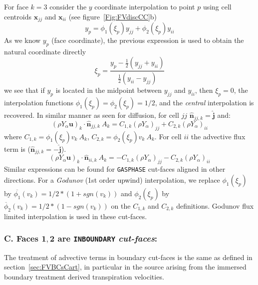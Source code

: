 \documentclass[12pt]{article}
\begin{document}
For face $k=3$ consider the $y$ coordinate interpolation to point $p$ using cell centroids $\mathbf{x}_{jj}$ and $\mathbf{x}_{ii}$ (see  figure~\ref{Fig:FVdiscCC}b)
%
\begin{equation}
  y_p =  \phi_1(\xi_p) y_{jj} + \phi_2(\xi_p) y_{ii}
\end{equation}
%
As we know $y_p$ (face coordinate), the previous expression is used to obtain the natural coordinate directly
%
\begin{equation}
  \xi_p = \frac{y_p - \frac{1}{2} \left( y_{jj} + y_{ii} \right)}{\frac{1}{2} \left( y_{ii} - y_{jj} \right)}
\end{equation}
%
we see that if $y_p$ is located in the midpoint between $y_{jj}$ and $y_{ii}$, then $\xi_p=0$, the interpolation functions $\phi_1(\xi_p)=\phi_2(\xi_p)=1/2$, and the \textit{central} interpolation is recovered. In similar manner as seen for diffusion, for cell $jj$
$\hat{\mathbf{n}}_{jj,k}=\hat{\mathbf{j}}$ and:
%
\begin{equation}
   \left( \rho Y_\alpha \mathbf{u} \right)_k \cdot \hat{\mathbf{n}}_{jj,k} \: A_k = C_{1,k} \left( \rho Y_\alpha \right)_{jj} + C_{2,k} \left( \rho Y_\alpha \right)_{ii}
\end{equation}
%
where $C_{1,k}=\phi_1(\xi_p) v_k \: A_k$, $C_{2,k}=\phi_2(\xi_p) v_k \: A_k$. For cell $ii$ the advective flux term is
($\hat{\mathbf{n}}_{jj,k}=-\hat{\mathbf{j}}$).
%
\begin{equation}
   \left( \rho Y_\alpha \mathbf{u} \right)_k \cdot \hat{\mathbf{n}}_{ii,k} \: A_k = - C_{1,k}  \left( \rho Y_\alpha \right)_{jj} - C_{2,k}  \left( \rho Y_\alpha \right)_{ii}
\end{equation}
%
Similar expressions can be found for \texttt{GASPHASE} cut-faces aligned in other directions. For a \textit{Godunov} (1st order upwind) interpolation,
we replace $\phi_1(\xi_p)$ by $\overline{\phi_1}(v_k)=1/2*(1+sgn(v_k))$ and $\phi_2(\xi_p)$ by $\overline{\phi}_2(v_k)=1/2*(1-sgn(v_k))$ on the $C_{1,k}$ and $C_{2,k}$ definitions. Godunov flux limited interpolation is used in these cut-faces.


\subsubsection*{C. Faces $\mathbf{1},\mathbf{2}$ are \texttt{INBOUNDARY} \textit{cut-faces}:}

The treatment of advective terms in boundary cut-faces is the same as defined in section~\ref{sec:FVBCsCart}, in particular in the source arising from the immersed boundary treatment derived transpiration velocities.
\end{document}
